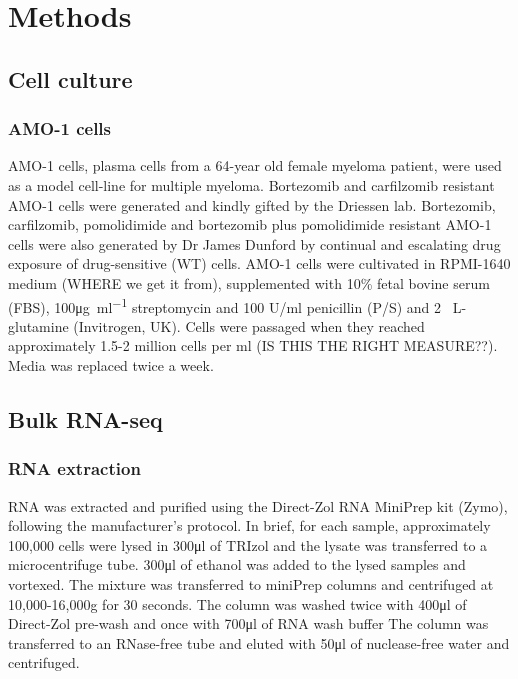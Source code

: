 \chapter{\label{ch:3-methods}Methods}


\section{Cell culture}
\subsection{AMO-1 cells}
AMO-1 cells, plasma cells from a 64-year old female myeloma patient, were used as a model cell-line for multiple myeloma.
Bortezomib and carfilzomib resistant AMO-1 cells were generated and kindly gifted by the Driessen lab\cite{soriano2016proteasome}.
Bortezomib, carfilzomib, pomolidimide and bortezomib plus pomolidimide resistant AMO-1 cells were also generated by Dr James Dunford by continual and escalating drug exposure of drug-sensitive (WT) cells.
AMO-1 cells were cultivated in RPMI-1640 medium (WHERE we get it from), supplemented with 10\% fetal bovine serum (FBS), 100\si{\ug\per\ml} streptomycin and 100 U/ml penicillin (P/S) and 2\si{\milli\Molar} L-glutamine (Invitrogen, UK).
Cells were passaged when they reached approximately 1.5-2 million cells per \si{\ml} (IS THIS THE RIGHT MEASURE??).
Media was replaced twice a week.


\section{Bulk RNA-seq}
\subsection{RNA extraction}
RNA was extracted and purified using the Direct-Zol RNA MiniPrep kit (Zymo), following the manufacturer's protocol.
In brief, for each sample, approximately 100,000 cells were lysed in 300\si{\ul} of TRIzol and the lysate was transferred to a microcentrifuge tube.
300\si{\ul} of ethanol was added to the lysed samples and vortexed.
The mixture was transferred to miniPrep columns and centrifuged at 10,000-16,000g for 30 seconds.
The column was washed twice with 400\si{\ul} of Direct-Zol pre-wash and once with 700\si{\micro\litre} of RNA wash buffer
The column was transferred to an RNase-free tube and eluted with 50\si{\ul} of nuclease-free water and centrifuged.

